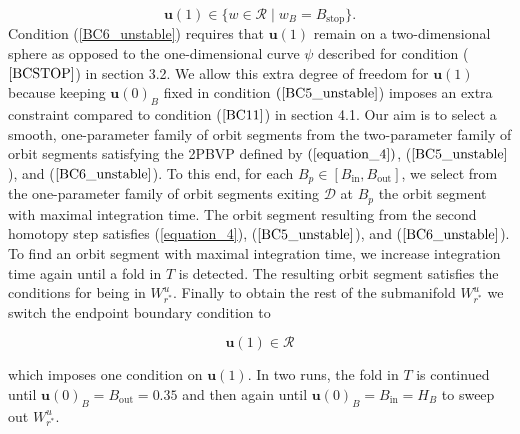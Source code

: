 \documentclass{ws-ijbc}
\begin{document}
\begin{equation}
\mathbf{u}(1) \in \{ w \in \mathscr{R} \; | \; w_B=B_{\mathrm{stop}}\}.
\label{BC6_unstable}
\end{equation}
\noindent
Condition (\ref{BC6_unstable}) requires that $\mathbf{u}(1)$ remain on a two-dimensional sphere as opposed to the one-dimensional curve $\psi$ described for condition ($\ref{BCSTOP}$) in section 3.2.  We allow this extra degree of freedom for $\mathbf{u}(1)$ because keeping $\mathbf{u}(0)_B$ fixed in condition $(\ref{BC5_unstable}$) imposes an extra constraint compared to condition ($\ref{BC11}$) in section 4.1.  Our aim is to select a smooth, one-parameter family of orbit segments from the two-parameter family of orbit segments satisfying the 2PBVP defined by $(\ref{equation_4})$, ($\ref{BC5_unstable}$), and ($\ref{BC6_unstable}$).  To this end, for each $B_p \in [B_{\mathrm{in}},B_{\mathrm{out}}]$, we select from the one-parameter family of orbit segments exiting $\mathscr{D}$ at $B_p$ the orbit segment with maximal integration time.  The orbit segment resulting from the second homotopy step satisfies (\ref{equation_4}), ($\ref{BC5_unstable}$), and ($\ref{BC6_unstable}$).  To find an orbit segment with maximal integration time, we increase integration time again until a fold in $T$ is detected.  The resulting orbit segment satisfies the conditions for being in $W^u_{r^*}$.  Finally to obtain the rest of the submanifold $W^u_{r^*}$ we switch the endpoint boundary condition to

\begin{equation}
\mathbf{u}(1) \in \mathscr{R}
\label{BC7_unstable}
\end{equation}

\noindent
which imposes one condition on $\mathbf{u}(1)$.  In two runs, the fold in $T$ is continued until $\mathbf{u}(0)_B=B_{\mathrm{out}}=0.35$ and then again until $\mathbf{u}(0)_B=B_{\mathrm{in}}=H_B$ to sweep out $W^u_{r^*}$.
\end{document}
